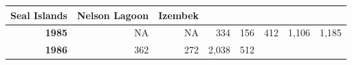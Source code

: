 \documentclass[]{article}
\begin{document}
\begin{longtable}[]{@{}rrrrrrrr@{}}
\begin{minipage}[b]{0.09\columnwidth}
\textbf{Seal Islands}\strut
\end{minipage} & \begin{minipage}[b]{0.08\columnwidth}\raggedleft\strut
\textbf{Nelson Lagoon}\strut
\end{minipage} & \begin{minipage}[b]{0.10\columnwidth}\raggedleft\strut
\textbf{Izembek}\strut
\end{minipage}\tabularnewline
\midrule
\endhead
\begin{minipage}[t]{0.08\columnwidth}\raggedleft\strut
\textbf{1985}\strut
\end{minipage} & \begin{minipage}[t]{0.10\columnwidth}\raggedleft\strut
NA\strut
\end{minipage} & \begin{minipage}[t]{0.11\columnwidth}\raggedleft\strut
NA\strut
\end{minipage} & \begin{minipage}[t]{0.08\columnwidth}\raggedleft\strut
334\strut
\end{minipage} & \begin{minipage}[t]{0.14\columnwidth}\raggedleft\strut
156\strut
\end{minipage} & \begin{minipage}[t]{0.09\columnwidth}\raggedleft\strut
412\strut
\end{minipage} & \begin{minipage}[t]{0.08\columnwidth}\raggedleft\strut
1,106\strut
\end{minipage} & \begin{minipage}[t]{0.10\columnwidth}\raggedleft\strut
1,185\strut
\end{minipage}\tabularnewline
\begin{minipage}[t]{0.08\columnwidth}\raggedleft\strut
\textbf{1986}\strut
\end{minipage} & \begin{minipage}[t]{0.10\columnwidth}\raggedleft\strut
362\strut
\end{minipage} & \begin{minipage}[t]{0.11\columnwidth}\raggedleft\strut
272\strut
\end{minipage} & \begin{minipage}[t]{0.08\columnwidth}\raggedleft\strut
2,038\strut
\end{minipage} & \begin{minipage}[t]{0.14\columnwidth}\raggedleft\strut
512\strut
\end{minipage} & \begin{minipage}[t]{0.09\columnwidth}\raggedleft\strut

\end{minipage}
\end{longtable}
\end{document}
